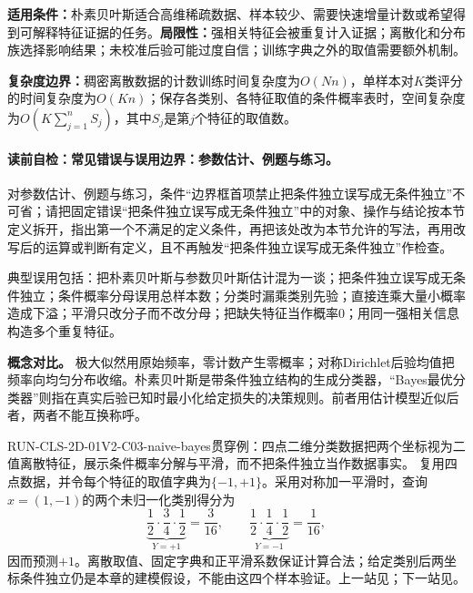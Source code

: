 \label{struct:V2-C03-CH28}
\label{struct:V2-C03-CH29}
\begin{applicabilitybox}
\textbf{适用条件：}朴素贝叶斯适合高维稀疏数据、样本较少、需要快速增量计数或希望得到可解释特征证据的任务。\textbf{局限性：}强相关特征会被重复计入证据；离散化和分布族选择影响结果；未校准后验可能过度自信；训练字典之外的取值需要额外机制。

\textbf{复杂度边界：}稠密离散数据的计数训练时间复杂度为$O(Nn)$，单样本对$K$类评分的时间复杂度为$O(Kn)$；保存各类别、各特征取值的条件概率表时，空间复杂度为$O\!\left(K\sum_{j=1}^{n}S_j\right)$，其中$S_j$是第$j$个特征的取值数。
\end{applicabilitybox}

\label{struct:V2-C03-CH30}
\paragraph{读前自检：常见错误与误用边界：参数估计、例题与练习。}对参数估计、例题与练习，条件“边界框首项禁止把条件独立误写成无条件独立”不可省；请把固定错误“把条件独立误写成无条件独立”中的对象、操作与结论按本节定义拆开，指出第一个不满足的定义条件，再把该处改为本节允许的写法，再用改写后的运算或判断有定义，且不再触发“把条件独立误写成无条件独立”作检查。\par

\begin{warningbox}
典型误用包括：把朴素贝叶斯与参数贝叶斯估计混为一谈；把条件独立误写成无条件独立；条件概率分母误用总样本数；分类时漏乘类别先验；直接连乘大量小概率造成下溢；平滑只改分子而不改分母；把缺失特征当作概率0；用同一强相关信息构造多个重复特征。
\end{warningbox}

\label{struct:V2-C03-CH31}
\begin{comparisonbox}
\textbf{概念对比。}
极大似然用原始频率，零计数产生零概率；对称Dirichlet后验均值把频率向均匀分布收缩。朴素贝叶斯是带条件独立结构的生成分类器，“Bayes最优分类器”则指在真实后验已知时最小化给定损失的决策规则。前者用估计模型近似后者，两者不能互换称呼。
\end{comparisonbox}

\begin{SLRunningExample}{RUN-CLS-2D-01}{V2-C03-naive-bayes}{贯穿例：四点二维分类数据}{把两个坐标视为二值离散特征，展示条件概率分解与平滑，而不把条件独立当作数据事实。}
复用四点数据，并令每个特征的取值字典为$\{-1,+1\}$。采用对称加一平滑时，查询$x=(1,-1)$的两个未归一化类别得分为
\[
\underbrace{\frac12\cdot\frac34\cdot\frac12}_{Y=+1}=\frac{3}{16},
\qquad
\underbrace{\frac12\cdot\frac14\cdot\frac12}_{Y=-1}=\frac{1}{16},
\]
因而预测$+1$。离散取值、固定字典和正平滑系数保证计算合法；给定类别后两坐标条件独立仍是本章的建模假设，不能由这四个样本验证。上一站见；下一站见。
\end{SLRunningExample}


